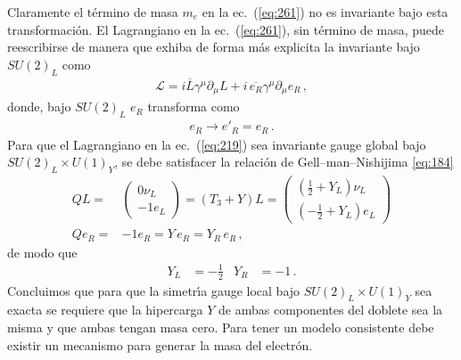Claramente el t\'ermino de masa $m_e$ en la ec.~(\ref{eq:261}) no es invariante bajo esta transformaci\'on. El Lagrangiano en la ec.~(\ref{eq:261}), sin t\'ermino de masa, puede reescribirse de manera que exhiba de forma m\'as explicita la invariante bajo $SU(2)_L$ como
\begin{align}
  \label{eq:219}
 \mathcal{L}=i\overline{L}\gamma^\mu\partial_\mu L+i\,\overline{e_R}\gamma^\mu\partial_\mu e_R\,,
\end{align}
donde, bajo $SU(2)_L$ $e_R$ transforma como
\begin{align}
  e_R\to e'_R=e_R\,.
\end{align}
Para que el Lagrangiano en la ec.~(\ref{eq:219}) sea invariante gauge global bajo $SU(2)_L\times U(1)_Y$, se debe satisfacer la relaci\'on de Gell--man--Nishijima \eqref{eq:184}
\begin{align}
  Q L=&
  \begin{pmatrix}
    0 \nu_L\\
    -1 e_L 
  \end{pmatrix}=
 (T_3+Y) L=
 \begin{pmatrix}
   \left(\frac{1}{2}+Y_L\right)\nu_L\\
   \left(-\frac{1}{2}+Y_L\right)e_L
 \end{pmatrix}
\nonumber\\
  Q e_R =&-1 e_R= Y\, e_R =Y_R\, e_R\,,
\end{align}
de modo que
\begin{align}
  Y_L&=-\frac{1}{2}& Y_R&=-1\,.
\end{align}
Concluimos que para que la simetr\'\i a gauge local bajo $SU(2)_L\times U(1)_Y$ sea exacta se requiere que la hipercarga $Y$ de ambas componentes del doblete sea la misma y que ambas tengan masa cero. Para tener un modelo consistente debe existir un mecanismo para generar la masa del electr\'on. 
